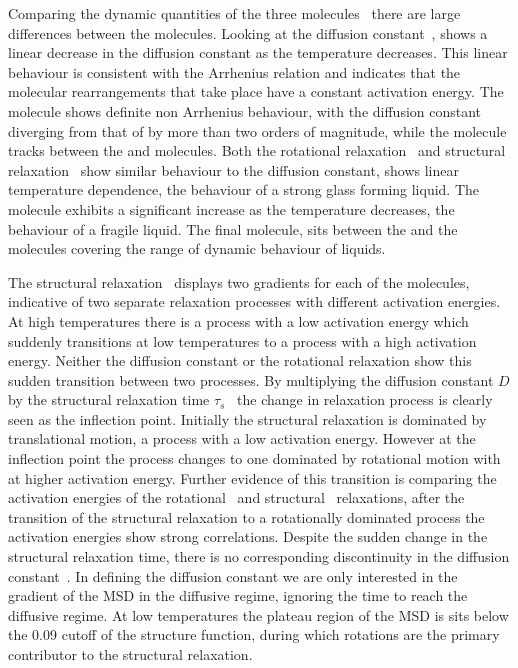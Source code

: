 Comparing the dynamic quantities of the three molecules~ there are large differences between the molecules. Looking at the diffusion constant~, \done shows a linear decrease in the diffusion constant as the temperature decreases. This linear behaviour is consistent with the Arrhenius relation and indicates that the molecular rearrangements that take place have a constant activation energy. The \dcon molecule shows definite non Arrhenius behaviour, with the diffusion constant diverging from that of \done by more than two orders of magnitude, while the \tri molecule tracks between the \done and \dcon molecules. Both the rotational relaxation~ and structural relaxation~ show similar behaviour to the diffusion constant, \done shows linear temperature dependence, the behaviour of a strong glass forming liquid. The \dcon molecule exhibits a significant increase as the temperature decreases, the behaviour of a fragile liquid. The final molecule, \tri sits between the \done and the \dcon molecules covering the range of dynamic behaviour of liquids.

The structural relaxation~ displays two gradients for each of the molecules, indicative of two separate relaxation processes with different activation energies. At high temperatures there is a process with a low activation energy which suddenly transitions at low temperatures to a process with a high activation energy. Neither the diffusion constant or the rotational relaxation show this sudden transition between two processes. By multiplying the diffusion constant $D$ by the structural relaxation time $\tau_s$~ the change in relaxation process is clearly seen as the inflection point. Initially the structural relaxation is dominated by translational motion, a process with a low activation energy. However at the inflection point the process changes to one dominated by rotational motion with at higher activation energy. Further evidence of this transition is comparing the activation energies of the rotational~ and structural~ relaxations, after the transition of the structural relaxation to a rotationally dominated process the activation energies show strong correlations. Despite the sudden change in the structural relaxation time, there is no corresponding discontinuity in the diffusion constant~. In defining the diffusion constant we are only interested in the gradient of the MSD in the diffusive regime, ignoring the time to reach the diffusive regime. At low temperatures the plateau region of the MSD is sits below the 0.09 cutoff of the structure function, during which rotations are the primary contributor to the structural relaxation. 

